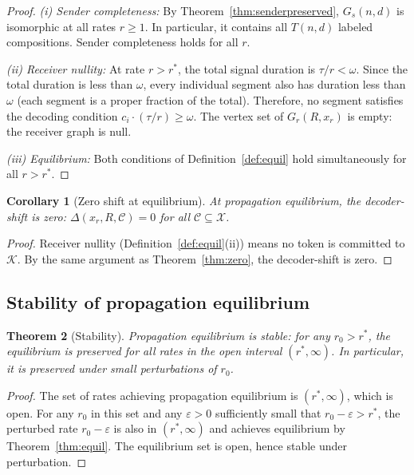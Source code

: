 \documentclass[twocolumn,11pt,a4paper]{article}
\theoremstyle{main}
\newtheorem{theorem}{Theorem}[section]
\newtheorem{corollary}[theorem]{Corollary}
\theoremstyle{definition}
\theoremstyle{remark}
\newcommand{\Out}{\mathcal{X}}
\newcommand{\Know}{\mathcal{K}}
\newcommand{\Cell}{\mathcal{C}}
\newcommand{\Recv}{R}
\newcommand{\shift}{\Delta}
\newcommand{\Traj}{T}
\newcommand{\rate}{r}
\newcommand{\window}{\omega}
\begin{document}
\begin{proof}
\emph{(i) Sender completeness:} By Theorem~\ref{thm:senderpreserved},
$G_s(n,d)$ is isomorphic at all rates $\rate \geq 1$. In particular,
it contains all $\Traj(n,d)$ labeled compositions. Sender completeness
holds for all $\rate$.

\emph{(ii) Receiver nullity:} At rate $\rate > \rate^*$, the total
signal duration is $\tau/\rate < \window$. Since the total duration is
less than $\window$, every individual segment also has duration less
than $\window$ (each segment is a proper fraction of the total).
Therefore, no segment satisfies the decoding condition
$c_i \cdot (\tau/\rate) \geq \window$. The vertex set of
$G_r(\Recv, x_\rate)$ is empty: the receiver graph is null.

\emph{(iii) Equilibrium:} Both conditions of
Definition~\ref{def:equil} hold simultaneously for all
$\rate > \rate^*$.
\end{proof}

\begin{corollary}[Zero shift at equilibrium]
\label{cor:zeroeq}
At propagation equilibrium, the decoder-shift is zero:
$\shift(x_\rate, \Recv, \Cell) = 0$ for all $\Cell \subseteq \Out$.
\end{corollary}

\begin{proof}
Receiver nullity (Definition~\ref{def:equil}(ii)) means no token is
committed to $\Know$. By the same argument as Theorem~\ref{thm:zero},
the decoder-shift is zero.
\end{proof}

\subsection{Stability of propagation equilibrium}

\begin{theorem}[Stability]
\label{thm:stability}
Propagation equilibrium is stable: for any $\rate_0 > \rate^*$, the
equilibrium is preserved for all rates in the open interval
$(\rate^*, \infty)$. In particular, it is preserved under small
perturbations of $\rate_0$.
\end{theorem}

\begin{proof}
The set of rates achieving propagation equilibrium is $(\rate^*, \infty)$,
which is open. For any $\rate_0$ in this set and any $\varepsilon > 0$
sufficiently small that $\rate_0 - \varepsilon > \rate^*$, the perturbed
rate $\rate_0 - \varepsilon$ is also in $(\rate^*, \infty)$ and achieves
equilibrium by Theorem~\ref{thm:equil}. The equilibrium set is open,
hence stable under perturbation.
\end{proof}
\end{document}
